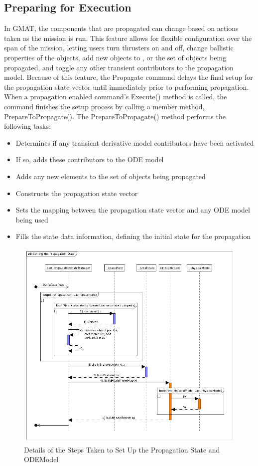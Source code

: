 \documentclass[10pt]{article}
\begin{document}
\subsection{Preparing for Execution}

In GMAT, the components that are propagated can change based on actions taken as the mission is
run.  This feature allows for flexible configuration over the span of the mission, letting users
turn thrusters on and off, change ballistic properties of the objects, add new objects to , or
the set of objects being propagated, and toggle any other transient contributors to the
propagation model.  Because of this feature, the Propagate command delays the final setup for the
propagation state vector until immediately prior to performing propagation.  When a propagation
enabled command's Execute() method is called, the command finishes the setup process by calling a
member method, PrepareToPropagate(). The PrepareToPropagate() method performs the following tasks:

\begin{itemize}
\item Determines if any transient derivative model contributors have been activated
\item If so, adds these contributors to the ODE model
\item Adds any new elements to the set of objects being propagated
\item Constructs the propagation state vector
\item Sets the mapping between the propagation state vector and any ODE model being used
\item Fills the state data information, defining the initial state for the propagation
\end{itemize}


\begin{figure}[htb]
\centering
\includegraphics[380,335]{Images/SettingthePropagationState.png}
\caption{Details of the Steps Taken to Set Up the Propagation State and ODEModel}
\label{fig:P2PSetPropSate}
\end{figure}
\end{document}
